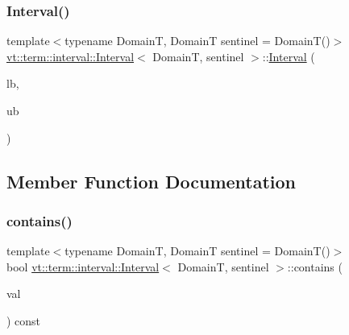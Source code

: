 \subsubsection{\texorpdfstring{Interval()}{Interval()}\hspace{0.1cm}{\footnotesize\ttfamily [5/5]}}
{\footnotesize\ttfamily template$<$typename DomainT, DomainT sentinel = Domain\+T()$>$ \\
\hyperlink{structvt_1_1term_1_1interval_1_1_interval}{vt\+::term\+::interval\+::\+Interval}$<$ DomainT, sentinel $>$\+::\hyperlink{structvt_1_1term_1_1interval_1_1_interval}{Interval} (\begin{DoxyParamCaption}\item[{DomainT const \&}]{lb,  }\item[{DomainT const \&}]{ub }\end{DoxyParamCaption})\hspace{0.3cm}{\ttfamily [inline]}}



\subsection{Member Function Documentation}
\mbox{\label{structvt_1_1term_1_1interval_1_1_interval_a7464cff4f0697f02604868fcf60a8132}} 
\subsubsection{\texorpdfstring{contains()}{contains()}}
{\footnotesize\ttfamily template$<$typename DomainT, DomainT sentinel = Domain\+T()$>$ \\
bool \hyperlink{structvt_1_1term_1_1interval_1_1_interval}{vt\+::term\+::interval\+::\+Interval}$<$ DomainT, sentinel $>$\+::contains (\begin{DoxyParamCaption}\item[{DomainT const \&}]{val }\end{DoxyParamCaption}) const\hspace{0.3cm}{\ttfamily [inline]}}

\mbox{\label{structvt_1_1term_1_1interval_1_1_interval_aff4a5032ac979adcc393022e77acffb6}} 
